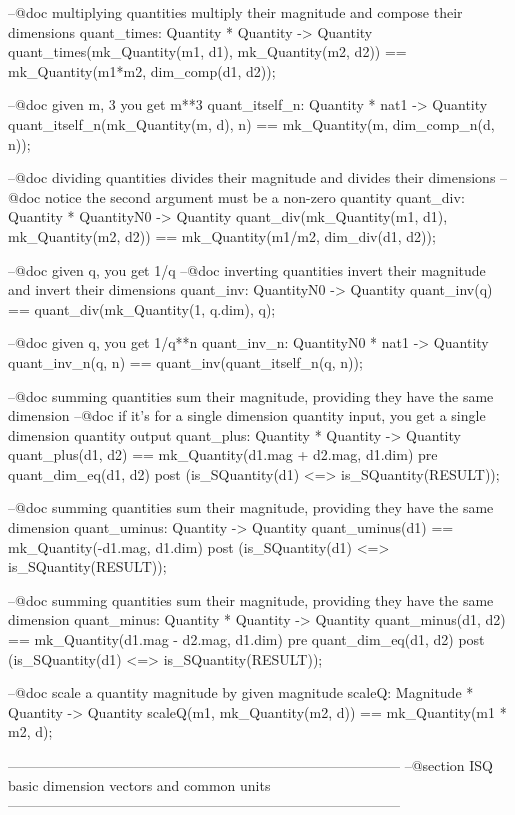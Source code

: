 \documentclass[a4paper]{article}
\begin{document}
\begin{vdm_al}
 --@doc multiplying quantities multiply their magnitude and compose their dimensions
 quant_times: Quantity * Quantity -> Quantity
 quant_times(mk_Quantity(m1, d1), mk_Quantity(m2, d2)) == 
  mk_Quantity(m1*m2, dim_comp(d1, d2));
            
 --@doc given m, 3 you get m**3
 quant_itself_n: Quantity * nat1 -> Quantity
 quant_itself_n(mk_Quantity(m, d), n) == mk_Quantity(m, dim_comp_n(d, n));
            
 --@doc dividing quantities divides their magnitude and divides their dimensions
 --@doc notice the second argument must be a non-zero quantity
 quant_div: Quantity * QuantityN0 -> Quantity
 quant_div(mk_Quantity(m1, d1), mk_Quantity(m2, d2)) ==
  mk_Quantity(m1/m2, dim_div(d1, d2));
            
 --@doc given q, you get 1/q 
 --@doc inverting quantities invert their magnitude and invert their dimensions
 quant_inv: QuantityN0 -> Quantity
 quant_inv(q) == quant_div(mk_Quantity(1, q.dim), q);

 --@doc given q, you get 1/q**n 
 quant_inv_n: QuantityN0 * nat1 -> Quantity
 quant_inv_n(q, n) == quant_inv(quant_itself_n(q, n));
            
 --@doc summing quantities sum their magnitude, providing they have the same dimension
 --@doc if it's for a single dimension quantity input, you get a single dimension quantity output 
 quant_plus: Quantity * Quantity -> Quantity
 quant_plus(d1, d2) == mk_Quantity(d1.mag + d2.mag, d1.dim)
 pre
  quant_dim_eq(d1, d2)
 post
  (is_SQuantity(d1) <=> is_SQuantity(RESULT));
            
 --@doc summing quantities sum their magnitude, providing they have the same dimension
 quant_uminus: Quantity -> Quantity
 quant_uminus(d1) == mk_Quantity(-d1.mag, d1.dim)
 post
  (is_SQuantity(d1) <=> is_SQuantity(RESULT));

 --@doc summing quantities sum their magnitude, providing they have the same dimension
 quant_minus: Quantity * Quantity -> Quantity
 quant_minus(d1, d2) == mk_Quantity(d1.mag - d2.mag, d1.dim)
 pre
  quant_dim_eq(d1, d2)
 post
  (is_SQuantity(d1) <=> is_SQuantity(RESULT));

 --@doc scale a quantity magnitude by given magnitude 
 scaleQ: Magnitude * Quantity -> Quantity
 scaleQ(m1, mk_Quantity(m2, d)) == mk_Quantity(m1 * m2, d);

------------------------------------------------------------------------------------
--@section ISQ basic dimension vectors and common units
------------------------------------------------------------------------------------


\end{vdm_al}
\end{document}
